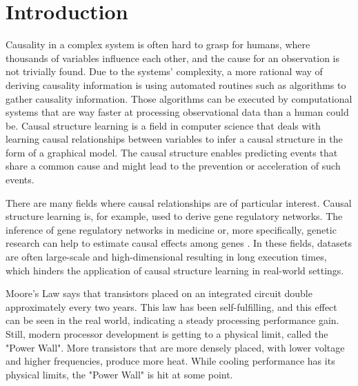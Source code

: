 \chapter{Introduction}
Causality in a complex system is often hard to grasp for humans, where thousands of variables influence each other, and the cause for an observation is not trivially found. Due to the systems' complexity, a more rational way of deriving causality information is using automated routines such as algorithms to gather causality information.  Those algorithms can be executed by computational systems that are way faster at processing observational data than a human could be.
Causal structure learning is a field in computer science that deals with learning causal relationships between variables to infer a causal structure in the form of a graphical model. The causal structure enables predicting events that share a common cause and might lead to the prevention or acceleration of such events.


There are many fields where causal relationships are of particular interest. Causal structure learning is, for example, used to derive gene regulatory networks. The inference of gene regulatory networks in medicine or, more specifically, genetic research can help to estimate causal effects among genes \cite{rauJointEstimationCausal2013}.
In these fields, datasets are often large-scale and high-dimensional resulting in long execution times, which hinders the application of causal structure learning in real-world settings.

Moore's Law \cite{mooreCrammingMoreComponents1965} says that transistors placed on an integrated circuit double approximately every two years. This law has been self-fulfilling, and this effect can be seen in the real world, indicating a steady processing performance gain. Still, modern processor development is getting to a physical limit, called the "Power Wall". More transistors that are more densely placed, with lower voltage and higher frequencies, produce more heat. While cooling performance has its physical limits, the "Power Wall" is hit at some point.

